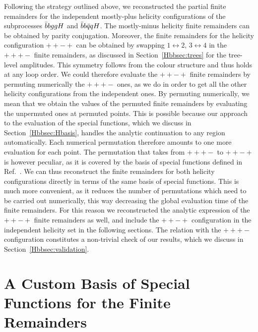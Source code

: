 \documentclass[main.tex]{subfiles}
\begin{document}
Following the strategy outlined above, we reconstructed the partial finite remainders for the independent mostly-plus helicity configurations of the subprocesses $\bar{b}bggH$ and $\bar{b}b\bar{q}qH$. The mostly-minus helicity finite remainders can be obtained by parity conjugation. Moreover, the finite remainders for the helicity configuration $++-+$ can be obtained by swapping $1\leftrightarrow2$, $3\leftrightarrow 4$ in the $+++-$ finite remainders, as discussed in Section~\ref{Hbbsec:trees} for the tree-level amplitudes. 
This symmetry follows from the colour structure and thus holds at any loop order. 
We could therefore evaluate the $++-+$ finite remainders by permuting numerically the $+++-$ ones, as we do in order to get all the other helicity configurations from the independent ones. By permuting numerically, we mean that we obtain the values of the permuted finite remainders by evaluating the unpermuted ones at permuted points. This is possible because our approach to the evaluation of the special functions, which we discuss in Section~\ref{Hbbsec:Hbasis}, handles the analytic continuation to any region automatically. Each numerical permutation therefore amounts to one more evaluation for each point. The permutation that takes from $+++-$ to $++-+$ is however peculiar, as it is covered by the basis of special functions defined in Ref.~\cite{Badger:2021nhg}. We can thus reconstruct the finite remainders for both helicity configurations directly in terms of the same basis of special functions. This is much more convenient, as it reduces the number of permutations which need to be carried out numerically, this way decreasing the global evaluation time of the finite remainders. For this reason we reconstructed the analytic expression of the $++-+$ finite remainders as well, and include the $++-+$ configuration in the independent helicity set in the following sections. 
The relation with the $+++-$ configuration constitutes a non-trivial check of our results, which we discuss in Section~\ref{Hbbsec:validation}.


\section[A Custom Basis for the Finite Remainders]{A Custom Basis of Special Functions for the Finite Remainders}
\end{document}
